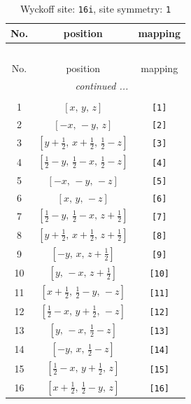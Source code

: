 \documentclass[fleqn,8pt]{jsarticle}
\begin{document}
\begin{longtable}{ccc}
\caption{Wyckoff site: {\tt 16i}, site symmetry: {\tt 1}}
 \\
 \hline \hline
No. & position & mapping \\ \hline \endfirsthead

\multicolumn{2}{l}{\tablename\ \thetable{}} \\
 \hline \hline
No. & position & mapping \\ \hline \endhead

 \hline \hline
\multicolumn{2}{r}{\footnotesize\it continued ...} \\ \endfoot

 \hline \hline
\multicolumn{2}{r}{} \\ \endlastfoot

1 & $\left[ x,\, y,\, z \right]$ & {\tt [1]} \\ \hline
2 & $\left[ - x,\, - y,\, z \right]$ & {\tt [2]} \\ \hline
3 & $\left[ y + \frac{1}{2},\, x + \frac{1}{2},\, \frac{1}{2} - z \right]$ & {\tt [3]} \\ \hline
4 & $\left[ \frac{1}{2} - y,\, \frac{1}{2} - x,\, \frac{1}{2} - z \right]$ & {\tt [4]} \\ \hline
5 & $\left[ - x,\, - y,\, - z \right]$ & {\tt [5]} \\ \hline
6 & $\left[ x,\, y,\, - z \right]$ & {\tt [6]} \\ \hline
7 & $\left[ \frac{1}{2} - y,\, \frac{1}{2} - x,\, z + \frac{1}{2} \right]$ & {\tt [7]} \\ \hline
8 & $\left[ y + \frac{1}{2},\, x + \frac{1}{2},\, z + \frac{1}{2} \right]$ & {\tt [8]} \\ \hline
9 & $\left[ - y,\, x,\, z + \frac{1}{2} \right]$ & {\tt [9]} \\ \hline
10 & $\left[ y,\, - x,\, z + \frac{1}{2} \right]$ & {\tt [10]} \\ \hline
11 & $\left[ x + \frac{1}{2},\, \frac{1}{2} - y,\, - z \right]$ & {\tt [11]} \\ \hline
12 & $\left[ \frac{1}{2} - x,\, y + \frac{1}{2},\, - z \right]$ & {\tt [12]} \\ \hline
13 & $\left[ y,\, - x,\, \frac{1}{2} - z \right]$ & {\tt [13]} \\ \hline
14 & $\left[ - y,\, x,\, \frac{1}{2} - z \right]$ & {\tt [14]} \\ \hline
15 & $\left[ \frac{1}{2} - x,\, y + \frac{1}{2},\, z \right]$ & {\tt [15]} \\ \hline
16 & $\left[ x + \frac{1}{2},\, \frac{1}{2} - y,\, z \right]$ & {\tt [16]} \\
\end{longtable}
\end{document}
